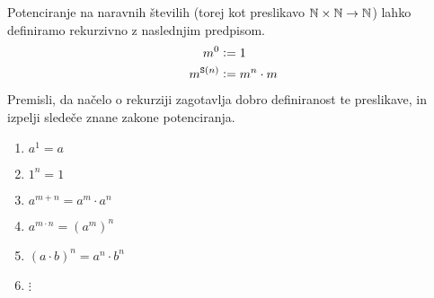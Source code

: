 \begin{vaja}
Potenciranje na naravnih številih (torej kot preslikavo $\mathbb{N} \times \mathbb{N} \to \mathbb{N}$) lahko definiramo rekurzivno z naslednjim predpisom.
\begin{align*}
m^0 &\mathrel{\mathop:}= 1 \\
m^{\mathtt{S}(n)} &\mathrel{\mathop:}= m^n \cdot m
\end{align*}
Premisli, da načelo o rekurziji zagotavlja dobro definiranost te preslikave, in izpelji sledeče znane zakone potenciranja.
\begin{enumerate}
\item
$a^1 = a$
\item
$1^n = 1$
\item
$a^{m + n} = a^m \cdot a^n$
\item
$a^{m \cdot n} = (a^m)^n$
\item
$(a \cdot b)^n = a^n \cdot b^n$
\item
$\vdots$
\end{enumerate}
\end{vaja}


